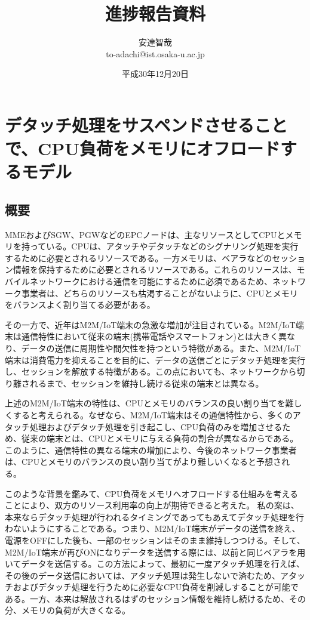 \documentclass[a4j]{ujarticle}
\title{進捗報告資料}
\author{安達智哉\\to-adachi@ist.osaka-u.ac.jp}
\date{平成30年12月20日}
\begin{document}
\maketitle

\section{デタッチ処理をサスペンドさせることで、CPU負荷をメモリにオフロードするモデル}

\subsection{概要}
MMEおよびSGW、PGWなどのEPCノードは、主なリソースとしてCPUとメモリを持っている。CPUは、アタッチやデタッチなどのシグナリング処理を実行するために必要とされるリソースである。一方メモリは、ベアラなどのセッション情報を保持するために必要とされるリソースである。これらのリソースは、モバイルネットワークにおける通信を可能にするために必須であるため、ネットワーク事業者は、どちらのリソースも枯渇することがないように、CPUとメモリをバランスよく割り当てる必要がある。

その一方で、近年はM2M/IoT端末の急激な増加が注目されている。M2M/IoT端末は通信特性において従来の端末(携帯電話やスマートフォン)とは大きく異なり、データの送信に周期性や間欠性を持つという特徴がある。また、M2M/IoT端末は消費電力を抑えることを目的に、データの送信ごとにデタッチ処理を実行し、セッションを解放する特徴がある。この点においても、ネットワークから切り離されるまで、セッションを維持し続ける従来の端末とは異なる。

上述のM2M/IoT端末の特性は、CPUとメモリのバランスの良い割り当てを難しくすると考えられる。なぜなら、M2M/IoT端末はその通信特性から、多くのアタッチ処理およびデタッチ処理を引き起こし、CPU負荷のみを増加させるため、従来の端末とは、CPUとメモリに与える負荷の割合が異なるからである。このように、通信特性の異なる端末の増加により、今後のネットワーク事業者は、CPUとメモリのバランスの良い割り当てがより難しいくなると予想される。

このような背景を鑑みて、CPU負荷をメモリへオフロードする仕組みを考えることにより、双方のリソース利用率の向上が期待できると考えた。
私の案は、本来ならデタッチ処理が行われるタイミングであってもあえてデタッチ処理を行わないようにすることである。つまり、M2M/IoT端末がデータの送信を終え、電源をOFFにした後も、一部のセッションはそのまま維持しつつける。そして、M2M/IoT端末が再びONになりデータを送信する際には、以前と同じベアラを用いてデータを送信する。この方法によって、最初に一度アタッチ処理を行えば、その後のデータ送信においては、アタッチ処理は発生しないで済むため、アタッチおよびデタッチ処理を行うために必要なCPU負荷を削減しすることが可能である。一方、本来は解放されるはずのセッション情報を維持し続けるため、その分、メモリの負荷が大きくなる。
\end{document}
